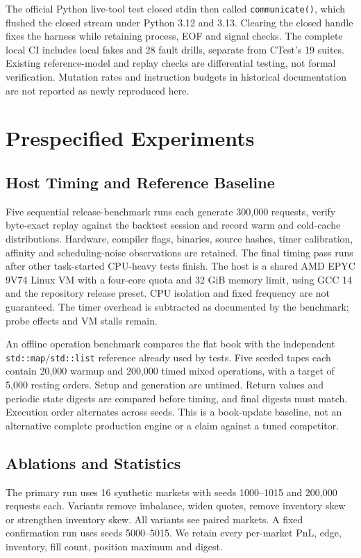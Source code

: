 \documentclass[conference]{IEEEtran}
\begin{document}
The official Python live-tool test closed stdin then called \texttt{communicate()}, which flushed the closed stream under Python 3.12 and 3.13. Clearing the closed handle fixes the harness while retaining process, EOF and signal checks. The complete local CI includes local fakes and 28 fault drills, separate from CTest's 19 suites. Existing reference-model and replay checks are differential testing, not formal verification. Mutation rates and instruction budgets in historical documentation are not reported as newly reproduced here.

\section{Prespecified Experiments}
\subsection{Host Timing and Reference Baseline}
Five sequential release-benchmark runs each generate 300,000 requests, verify byte-exact replay against the backtest session and record warm and cold-cache distributions. Hardware, compiler flags, binaries, source hashes, timer calibration, affinity and scheduling-noise observations are retained. The final timing pass runs after other task-started CPU-heavy tests finish. The host is a shared AMD EPYC 9V74 Linux VM with a four-core quota and 32 GiB memory limit, using GCC 14 and the repository release preset. CPU isolation and fixed frequency are not guaranteed. The timer overhead is subtracted as documented by the benchmark; probe effects and VM stalls remain.

An offline operation benchmark compares the flat book with the independent \texttt{std::map}/\texttt{std::list} reference already used by tests. Five seeded tapes each contain 20,000 warmup and 200,000 timed mixed operations, with a target of 5,000 resting orders. Setup and generation are untimed. Return values and periodic state digests are compared before timing, and final digests must match. Execution order alternates across seeds. This is a book-update baseline, not an alternative complete production engine or a claim against a tuned competitor.

\subsection{Ablations and Statistics}
The primary run uses 16 synthetic markets with seeds 1000--1015 and 200,000 requests each. Variants remove imbalance, widen quotes, remove inventory skew or strengthen inventory skew. All variants see paired markets. A fixed confirmation run uses seeds 5000--5015. We retain every per-market PnL, edge, inventory, fill count, position maximum and digest.
\end{document}

